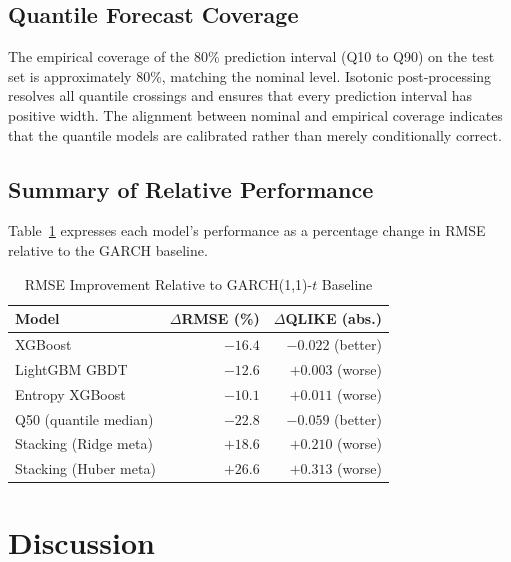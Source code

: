 \documentclass[12pt]{article}
\begin{document}
\subsection{Quantile Forecast Coverage}

The empirical coverage of the 80\% prediction interval (Q10 to Q90) on the
test set is approximately 80\%, matching the nominal level.  Isotonic
post-processing resolves all quantile crossings and ensures that every
prediction interval has positive width.  The alignment between nominal and
empirical coverage indicates that the quantile models are calibrated rather
than merely conditionally correct.

\subsection{Summary of Relative Performance}

Table~\ref{tab:improvements} expresses each model's performance as a
percentage change in RMSE relative to the GARCH baseline.

\begin{table}[htbp]
\centering
\caption{RMSE Improvement Relative to GARCH(1,1)-$t$ Baseline}
\label{tab:improvements}
\begin{tabular}{lrr}
\toprule
Model & $\Delta$RMSE (\%) & $\Delta$QLIKE (abs.) \\
\midrule
XGBoost                   & $-16.4$ & $-0.022$ (better) \\
LightGBM GBDT             & $-12.6$ & $+0.003$ (worse)  \\
Entropy XGBoost           & $-10.1$ & $+0.011$ (worse)  \\
Q50 (quantile median)     & $-22.8$ & $-0.059$ (better) \\
Stacking (Ridge meta)     & $+18.6$ & $+0.210$ (worse)  \\
Stacking (Huber meta)     & $+26.6$ & $+0.313$ (worse)  \\
\bottomrule
\end{tabular}
\end{table}


\section{Discussion}
\label{sec:disc}
\end{document}

